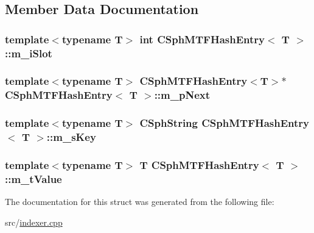 \subsection{Member Data Documentation}
\hypertarget{structCSphMTFHashEntry_a4f27793d9854ac4165417b2a3a63d944}{
\subsubsection[{m\-\_\-i\-Slot}]{\setlength{\rightskip}{0pt plus 5cm}template$<$typename T$>$ {\bf int} {\bf C\-Sph\-M\-T\-F\-Hash\-Entry}$<$ T $>$\-::m\-\_\-i\-Slot}}\label{structCSphMTFHashEntry_a4f27793d9854ac4165417b2a3a63d944}
\hypertarget{structCSphMTFHashEntry_a00c7a217756e5c37857a2eef3e744641}{
\subsubsection[{m\-\_\-p\-Next}]{\setlength{\rightskip}{0pt plus 5cm}template$<$typename T$>$ {\bf C\-Sph\-M\-T\-F\-Hash\-Entry}$<$T$>$$\ast$ {\bf C\-Sph\-M\-T\-F\-Hash\-Entry}$<$ T $>$\-::m\-\_\-p\-Next}}\label{structCSphMTFHashEntry_a00c7a217756e5c37857a2eef3e744641}
\hypertarget{structCSphMTFHashEntry_a42d93281868c9bb009e995bb92cc3da8}{
\subsubsection[{m\-\_\-s\-Key}]{\setlength{\rightskip}{0pt plus 5cm}template$<$typename T$>$ {\bf C\-Sph\-String} {\bf C\-Sph\-M\-T\-F\-Hash\-Entry}$<$ T $>$\-::m\-\_\-s\-Key}}\label{structCSphMTFHashEntry_a42d93281868c9bb009e995bb92cc3da8}
\hypertarget{structCSphMTFHashEntry_af337a7b77ab3aacdcd7989dd1978e199}{
\subsubsection[{m\-\_\-t\-Value}]{\setlength{\rightskip}{0pt plus 5cm}template$<$typename T$>$ T {\bf C\-Sph\-M\-T\-F\-Hash\-Entry}$<$ T $>$\-::m\-\_\-t\-Value}}\label{structCSphMTFHashEntry_af337a7b77ab3aacdcd7989dd1978e199}


The documentation for this struct was generated from the following file\-:\begin{DoxyCompactItemize}
\item 
src/\hyperlink{indexer_8cpp}{indexer.\-cpp}\end{DoxyCompactItemize}
